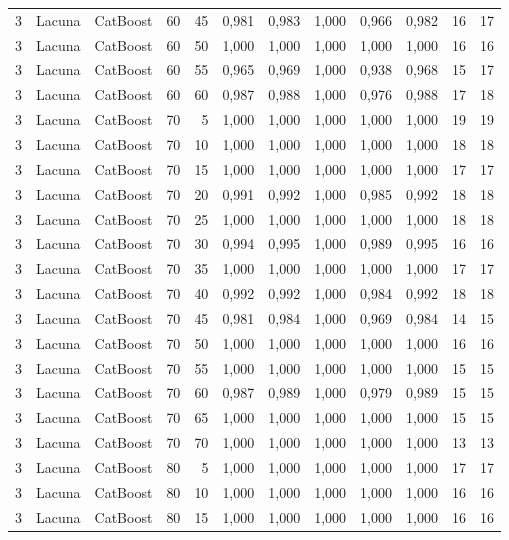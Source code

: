 \begin{longtable}{@{}rllrrrrrrrrr@{}}
3 & Lacuna & CatBoost & 60 & 45 & 0,981 & 0,983 & 1,000 & 0,966 & 0,982 & 16 & 17 \\
3 & Lacuna & CatBoost & 60 & 50 & 1,000 & 1,000 & 1,000 & 1,000 & 1,000 & 16 & 16 \\
3 & Lacuna & CatBoost & 60 & 55 & 0,965 & 0,969 & 1,000 & 0,938 & 0,968 & 15 & 17 \\
3 & Lacuna & CatBoost & 60 & 60 & 0,987 & 0,988 & 1,000 & 0,976 & 0,988 & 17 & 18 \\
3 & Lacuna & CatBoost & 70 & 5 & 1,000 & 1,000 & 1,000 & 1,000 & 1,000 & 19 & 19 \\
3 & Lacuna & CatBoost & 70 & 10 & 1,000 & 1,000 & 1,000 & 1,000 & 1,000 & 18 & 18 \\
3 & Lacuna & CatBoost & 70 & 15 & 1,000 & 1,000 & 1,000 & 1,000 & 1,000 & 17 & 17 \\
3 & Lacuna & CatBoost & 70 & 20 & 0,991 & 0,992 & 1,000 & 0,985 & 0,992 & 18 & 18 \\
3 & Lacuna & CatBoost & 70 & 25 & 1,000 & 1,000 & 1,000 & 1,000 & 1,000 & 18 & 18 \\
3 & Lacuna & CatBoost & 70 & 30 & 0,994 & 0,995 & 1,000 & 0,989 & 0,995 & 16 & 16 \\
3 & Lacuna & CatBoost & 70 & 35 & 1,000 & 1,000 & 1,000 & 1,000 & 1,000 & 17 & 17 \\
3 & Lacuna & CatBoost & 70 & 40 & 0,992 & 0,992 & 1,000 & 0,984 & 0,992 & 18 & 18 \\
3 & Lacuna & CatBoost & 70 & 45 & 0,981 & 0,984 & 1,000 & 0,969 & 0,984 & 14 & 15 \\
3 & Lacuna & CatBoost & 70 & 50 & 1,000 & 1,000 & 1,000 & 1,000 & 1,000 & 16 & 16 \\
3 & Lacuna & CatBoost & 70 & 55 & 1,000 & 1,000 & 1,000 & 1,000 & 1,000 & 15 & 15 \\
3 & Lacuna & CatBoost & 70 & 60 & 0,987 & 0,989 & 1,000 & 0,979 & 0,989 & 15 & 15 \\
3 & Lacuna & CatBoost & 70 & 65 & 1,000 & 1,000 & 1,000 & 1,000 & 1,000 & 15 & 15 \\
3 & Lacuna & CatBoost & 70 & 70 & 1,000 & 1,000 & 1,000 & 1,000 & 1,000 & 13 & 13 \\
3 & Lacuna & CatBoost & 80 & 5 & 1,000 & 1,000 & 1,000 & 1,000 & 1,000 & 17 & 17 \\
3 & Lacuna & CatBoost & 80 & 10 & 1,000 & 1,000 & 1,000 & 1,000 & 1,000 & 16 & 16 \\
3 & Lacuna & CatBoost & 80 & 15 & 1,000 & 1,000 & 1,000 & 1,000 & 1,000 & 16 & 16 \\

\end{longtable}
